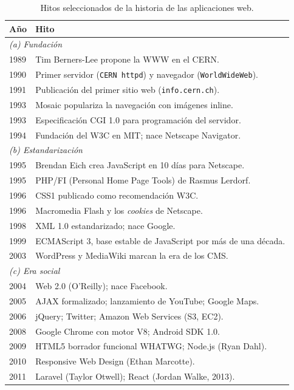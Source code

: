 \begin{table}[!htb]
\centering
\caption{Hitos seleccionados de la historia de las aplicaciones web.}
\label{tab:hitos-web}
\footnotesize
\begin{tabularx}{\textwidth}{lX}
\toprule
\textbf{Año} & \textbf{Hito}\\
\midrule
\multicolumn{2}{l}{\emph{(a) Fundación}}\\
1989 & Tim Berners-Lee propone la WWW en el CERN.\\
1990 & Primer servidor (\texttt{CERN httpd}) y navegador (\texttt{WorldWideWeb}).\\
1991 & Publicación del primer sitio web (\texttt{info.cern.ch}).\\
1993 & Mosaic populariza la navegación con imágenes inline.\\
1993 & Especificación CGI 1.0 para programación del servidor.\\
1994 & Fundación del W3C en MIT; nace Netscape Navigator.\\
\midrule
\multicolumn{2}{l}{\emph{(b) Estandarización}}\\
1995 & Brendan Eich crea JavaScript en 10 días para Netscape.\\
1995 & PHP/FI (Personal Home Page Tools) de Rasmus Lerdorf.\\
1996 & CSS1 publicado como recomendación W3C.\\
1996 & Macromedia Flash y los \emph{cookies} de Netscape.\\
1998 & XML 1.0 estandarizado; nace Google.\\
1999 & ECMAScript 3, base estable de JavaScript por más de una década.\\
2003 & WordPress y MediaWiki marcan la era de los CMS.\\
\midrule
\multicolumn{2}{l}{\emph{(c) Era social}}\\
2004 & Web 2.0 (O'Reilly); nace Facebook.\\
2005 & AJAX formalizado; lanzamiento de YouTube; Google Maps.\\
2006 & jQuery; Twitter; Amazon Web Services (S3, EC2).\\
2008 & Google Chrome con motor V8; Android SDK 1.0.\\
2009 & HTML5 borrador funcional WHATWG; Node.js (Ryan Dahl).\\
2010 & Responsive Web Design (Ethan Marcotte).\\
2011 & Laravel (Taylor Otwell); React (Jordan Walke, 2013).\\

\end{tabularx}
\end{table}
